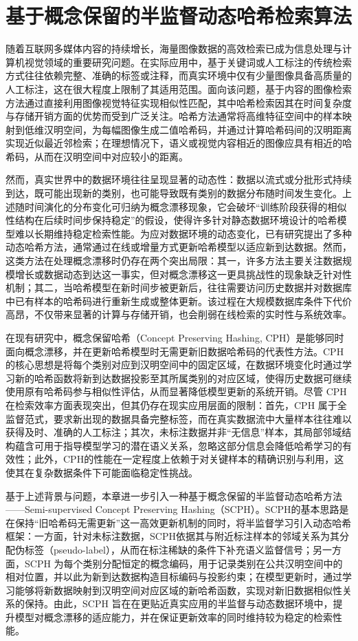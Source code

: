 \chapter{基于概念保留的半监督动态哈希检索算法}
\label{chap:scph}

随着互联网多媒体内容的持续增长，海量图像数据的高效检索已成为信息处理与计算机视觉领域的重要研究问题。在实际应用中，基于关键词或人工标注的传统检索方式往往依赖完整、准确的标签或注释，而真实环境中仅有少量图像具备高质量的人工标注，这在很大程度上限制了其适用范围。面向该问题，基于内容的图像检索方法通过直接利用图像视觉特征实现相似性匹配，其中哈希检索因其在时间复杂度与存储开销方面的优势而受到广泛关注。哈希方法通常将高维特征空间中的样本映射到低维汉明空间，为每幅图像生成二值哈希码，并通过计算哈希码间的汉明距离实现近似最近邻检索；在理想情况下，语义或视觉内容相近的图像应具有相近的哈希码，从而在汉明空间中对应较小的距离。

然而，真实世界中的数据环境往往呈现显著的动态性：数据以流式或分批形式持续到达，既可能出现新的类别，也可能导致既有类别的数据分布随时间发生变化。上述随时间演化的分布变化可归纳为概念漂移现象，它会破坏“训练阶段获得的相似性结构在后续时间步保持稳定”的假设，使得许多针对静态数据环境设计的哈希模型难以长期维持稳定检索性能。为应对数据环境的动态变化，已有研究提出了多种动态哈希方法，通常通过在线或增量方式更新哈希模型以适应新到达数据。然而，这类方法在处理概念漂移时仍存在两个突出局限：其一，许多方法主要关注数据规模增长或数据动态到达这一事实，但对概念漂移这一更具挑战性的现象缺乏针对性机制；其二，当哈希模型在新时间步被更新后，往往需要访问历史数据并对数据库中已有样本的哈希码进行重新生成或整体更新。该过程在大规模数据库条件下代价高昂，不仅带来显著的计算与存储开销，也会削弱在线检索的实时性与系统效率。

在现有研究中，概念保留哈希（Concept Preserving Hashing, CPH）是能够同时面向概念漂移，并在更新哈希模型时无需更新旧数据哈希码的代表性方法。CPH 的核心思想是将每个类别对应到汉明空间中的固定区域，在数据环境变化时通过学习新的哈希函数将新到达数据投影至其所属类别的对应区域，使得历史数据可继续使用原有哈希码参与相似性评估，从而显著降低模型更新的系统开销。尽管 CPH 在检索效率方面表现突出，但其仍存在现实应用层面的限制：首先，CPH 属于全监督范式，要求新出现的数据具备完整标签，而在真实数据流中大量样本往往难以获得及时、准确的人工标注；其次，未标注数据并非“无信息”样本，其局部邻域结构蕴含可用于指导模型学习的潜在语义关系，忽略这部分信息会降低哈希学习的有效性；此外，CPH的性能在一定程度上依赖于对关键样本的精确识别与利用，这使其在复杂数据条件下可能面临稳定性挑战。

基于上述背景与问题，本章进一步引入一种基于概念保留的半监督动态哈希方法——Semi-supervised Concept Preserving Hashing（SCPH）。SCPH的基本思路是在保持“旧哈希码无需更新”这一高效更新机制的同时，将半监督学习引入动态哈希框架：一方面，针对未标注数据，SCPH依据其与附近标注样本的邻域关系为其分配伪标签（pseudo-label），从而在标注稀缺的条件下补充语义监督信号；另一方面，SCPH 为每个类别分配恒定的概念编码，用于记录类别在公共汉明空间中的相对位置，并以此为新到达数据构造目标编码与投影约束；在模型更新时，通过学习能够将新数据映射到汉明空间对应区域的新哈希函数，实现对新旧数据相似性关系的保持。由此，SCPH 旨在在更贴近真实应用的半监督与动态数据环境中，提升模型对概念漂移的适应能力，并在保证更新效率的同时维持较为稳定的检索性能。

